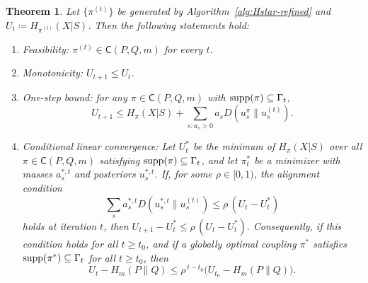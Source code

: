 \documentclass[journal]{IEEEtran}
\newtheorem{theorem}{Theorem}
\def\supp{\mathop{\rm supp}}
\newcommand{\1}{\mathbf{1}}
\begin{document}
\begin{theorem}\label{thm:Hstar-main}
Let \(\{\pi^{(t)}\}\) be generated by Algorithm~\ref{alg:Hstar-refined} and \(U_t\coloneqq H_{\pi^{(t)}}(X| S)\). Then the following statements hold:
\begin{enumerate}
\item Feasibility: \(\pi^{(t)}\in\mathsf C(P,Q,m)\) for every \(t\).
\item Monotonicity: \(U_{t+1}\le U_t\).
\item One-step bound: for any \(\pi\in\mathsf C(P,Q,m)\) with \(\supp(\pi)\subseteq\Gamma_t\),
\[U_{t+1}\le H_\pi(X| S) + \sum_{s:a_s>0} a_s D(u_s^\pi\|u_s^{(t)}).\]
\item Conditional linear convergence:
Let \(U_t^*\) be the minimum of \(H_\pi(X| S)\) over all
\(\pi\in\mathsf C(P,Q,m)\) satisfying \(\supp(\pi)\subseteq\Gamma_t\), and let
\(\pi_t^*\) be a minimizer with masses \(a_s^{*,t}\) and posteriors
\(u_s^{*,t}\). If, for some \(\rho\in[0,1)\), the alignment condition
\[
\sum_s a_s^{*,t}D(u_s^{*,t}\|u_s^{(t)})
\le
\rho\,(U_t-U_t^*)
\]
holds at iteration \(t\), then
\(U_{t+1}-U_t^* \le\rho\,(U_t-U_t^*).\)
Consequently, if this condition holds for all \(t\ge t_0\), and if a globally
optimal coupling \(\pi^*\) satisfies \(\supp(\pi^*)\subseteq\Gamma_t\) for all
\(t\ge t_0\), then
\[
U_t-H_m(P\|Q)
\le
\rho^{\,t-t_0}
\bigl(U_{t_0}-H_m(P\|Q)\bigr).
\]
\end{enumerate}
\end{theorem}
\end{document}
